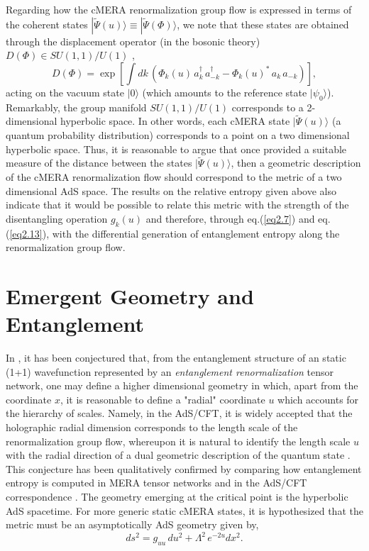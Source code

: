 \documentclass[preprint,aps]{revtex4}
\def\beq{\begin{equation}}
\def\eeq{\end{equation}}
\begin{document}
Regarding how the cMERA renormalization group flow is expressed in terms of the coherent states $|\widetilde{\Psi}(u)\rangle \equiv |\widetilde{\Psi}(\Phi)\rangle$, we note that these states are obtained through the displacement operator (in the bosonic theory) $D(\Phi)\in SU(1,1)/U(1)$ \cite{perelmonov},
\beq
\label{eq2.24}
D(\Phi) = \exp\left[\int dk\,\left( \Phi_k(u)\, a^{\dagger}_k\, a^{\dagger}_{-k} - \Phi_k(u)^{*}\, a_k\, a_{-k}\right)\right],
\eeq
acting on the vacuum state $|0\rangle$ (which amounts to the reference state $|\psi_0\rangle$). Remarkably, the group manifold $SU(1,1)/U(1)$ corresponds to a 2-dimensional hyperbolic space. In other words, each cMERA state $|\widetilde{\Psi}(u)\rangle$ (a quantum probability distribution) corresponds to a point on a two dimensional hyperbolic space.  Thus, it is reasonable to argue that once provided a suitable measure of the distance between the states $|\widetilde{\Psi}(u)\rangle$, then a geometric description of the cMERA renormalization flow should correspond to the metric of a two dimensional AdS space. The results on the relative entropy given above also indicate that it would be possible to relate this metric with the strength of the disentangling operation $g_k(u)$ and therefore, through eq.(\ref{eq2.7}) and eq.(\ref{eq2.13}), with the differential generation of entanglement entropy along the renormalization group flow.

\section{Emergent Geometry and Entanglement}
\label{geometry:cMERA}
In \cite{swingle}, it has been conjectured that, from the entanglement structure of an static (1+1) wavefunction represented by an \textit{entanglement renormalization} tensor network, one may define a higher dimensional geometry in which, apart from the coordinate $x$, it is reasonable to define a "radial" coordinate $u$ which accounts for the hierarchy of scales. Namely, in the AdS/CFT, it is widely accepted that the holographic radial dimension corresponds to the length scale of the renormalization group flow, whereupon it is natural to identify the length scale $u$ with the radial direction of a dual geometric description of the quantum state \cite{swingle}. This conjecture has been qualitatively confirmed by comparing how entanglement entropy is computed in MERA tensor networks and in the AdS/CFT correspondence \cite{ryutak}. The geometry emerging at the critical point is the hyperbolic AdS spacetime. For more generic static cMERA states, it is hypothesized that the metric must be an asymptotically AdS geometry given by,
\beq
\label{eq3.0}
ds^2 = g_{uu}\, du^2 + \Lambda^2\, e^{-2 u}dx^2.
\eeq
\end{document}
